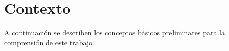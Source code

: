\section{Contexto}
\label{Context}
A continuación se describen los conceptos básicos preliminares para la
comprensión de este trabajo.
 



